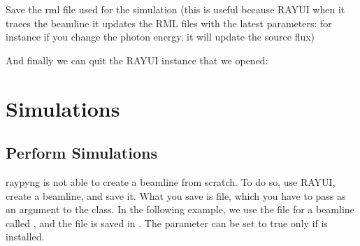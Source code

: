 \documentclass[letterpaper,10pt,english]{sphinxmanual}
\begin{document}
\sphinxAtStartPar
Save the rml file used for the simulation (this is useful because RAY\sphinxhyphen{}UI
when it traces the beamline it updates the RML files with the latest parameters: for
instance if you change the photon energy, it will update the source flux)

\begin{sphinxVerbatim}[commandchars=\\\{\}]
 \PYG{p}{[}\PYG{p}{]} 
\PYG{p}{[}\PYG{p}{]} 
\end{sphinxVerbatim}

\sphinxAtStartPar
And finally we can quit the RAY\sphinxhyphen{}UI instance that we opened:

\begin{sphinxVerbatim}[commandchars=\\\{\}]
 \PYG{p}{[}\PYG{p}{]} 
\end{sphinxVerbatim}


\section{Simulations}
\label{\detokenize{tutorial:simulations}}

\subsection{Perform Simulations}
\label{\detokenize{tutorial:perform-simulations}}
\sphinxAtStartPar
raypyng is not able to create a beamline from scratch. To do so, use RAY\sphinxhyphen{}UI,
create a beamline, and save it. What you save is  file, which you have to
pass as an argument to the  class. In the following example, we
use the file for a beamline called , and the file is saved in .
The  parameter can be set to true only if  is installed.

\begin{sphinxVerbatim}[commandchars=\\\{\}]
   
  

   
  
\end{sphinxVerbatim}
\end{document}
